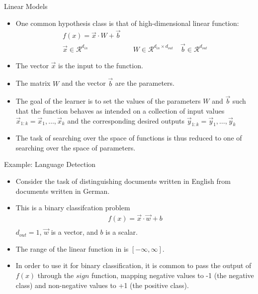 \documentclass[handout]{beamer}
\begin{document}
\begin{frame}{Linear Models}
\begin{scriptsize}
\begin{itemize}
\item One common hypothesis class is that of high-dimensional linear function:
\begin{equation}
\begin{split}
f(x) = \vec{x} \cdot W + \vec{b}\\
\vec{x} \in  \mathcal{R}^{d_{in}} & \quad W \in  \mathcal{R}^{d_{in}\times d_{out}} \quad \vec{b} \in  \mathcal{R}^{d_{out}}
\end{split}
\end{equation}
\item The vector $\vec{x}$ is the input to the function.
\item The matrix $W$ and the vector $\vec{b}$ are the parameters.

\item The goal of the learner is to set the values of the parameters $W$ and $\vec{b}$ such that the function behaves as intended on a collection of input values $\vec{x}_{1:k} = \vec{x}_1,\dots,\vec{x}_k$ and the corresponding desired outputs $\vec{y}_{1:k} = \vec{y}_1,\dots,\vec{y}_k$

\item The task of searching over the space of functions is thus reduced to one of searching over the space of parameters. \cite{goldberg2017neural}

\end{itemize}


\end{scriptsize}
\end{frame}


\begin{frame}{Example: Language Detection}
\begin{scriptsize}
\begin{itemize}
\item Consider the task of distinguishing documents written in English from documents written in German.
\item This is a binary classifcation problem 
\begin{equation}
\begin{split}
f(x) = \vec{x} \cdot \vec{w} + b\\
\end{split}
\end{equation}
 $d_{out}=1$, $\vec{w}$ is a vector, and $b$ is a scalar. 

 \item The range of the linear function in is $[-\infty,\infty]$.
 \item In order to use it for binary classification, it is common to pass the output of $f(x)$ through the $sign$ function, mapping negative values to -1 (the negative class) and non-negative values to +1 (the positive class).
\end{itemize}


\end{scriptsize}
\end{frame}
\end{document}
